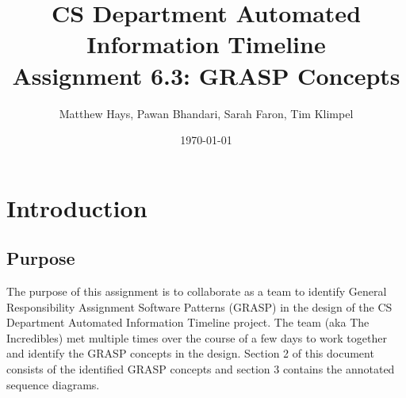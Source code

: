 \documentclass{article}
\title{CS Department Automated Information Timeline \\ Assignment 6.3: GRASP Concepts}
\date{\today}
\author{Matthew Hays, Pawan Bhandari, Sarah Faron, Tim Klimpel}
\begin{document}
\maketitle
\newpage
\tableofcontents
\listoffigures
\newpage
\section{Introduction}
\subsection{Purpose}
The purpose of this assignment is to collaborate as a team to identify General Responsibility Assignment Software Patterns (GRASP) in the design of the CS Department Automated Information Timeline project. The team (aka The Incredibles) met multiple times over the course of a few days to work together and identify the GRASP concepts in the design. Section 2 of this document consists of the identified GRASP concepts and section 3 contains the annotated sequence diagrams.
\end{document}
